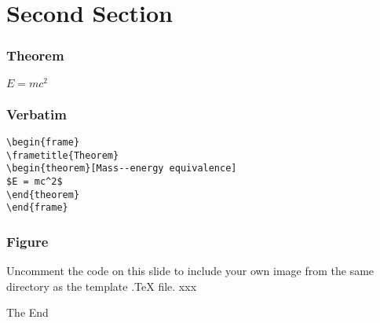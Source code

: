 \documentclass[xetex]{beamer}
\begin{document}
\section{Second Section}

\begin{frame}
\frametitle{Theorem}
\begin{theorem}
$E = mc^2$
\end{theorem}
\end{frame}

\begin{frame}[fragile] %
\frametitle{Verbatim}
\begin{example}
\begin{verbatim}
\begin{frame}
\frametitle{Theorem}
\begin{theorem}[Mass--energy equivalence]
$E = mc^2$
\end{theorem}
\end{frame}\end{verbatim}
\end{example}
\end{frame}


\begin{frame}
\frametitle{Figure}
Uncomment the code on this slide to include your own image from the same directory as the template .TeX file. xxx
\end{frame}


\begin{frame}
\Huge{\centerline{The End}}
\end{frame}
\end{document}
